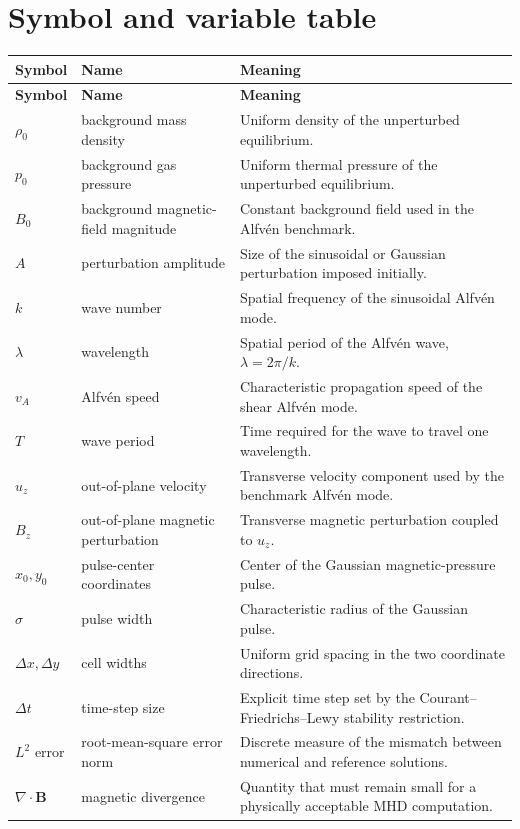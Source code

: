 \documentclass[11pt]{article}
\newcommand{\Bvec}{\mathbf{B}}
\begin{document}
\section{Symbol and variable table}
\begin{longtable}{>{\raggedright\arraybackslash}p{} >{\raggedright\arraybackslash}p{} >{\raggedright\arraybackslash}p{}}
\toprule
\textbf{Symbol} & \textbf{Name} & \textbf{Meaning} \\
\midrule
\endfirsthead
\toprule
\textbf{Symbol} & \textbf{Name} & \textbf{Meaning} \\
\midrule
\endhead
$\rho_0$ & background mass density & Uniform density of the unperturbed equilibrium. \\
$p_0$ & background gas pressure & Uniform thermal pressure of the unperturbed equilibrium. \\
$B_0$ & background magnetic-field magnitude & Constant background field used in the Alfv\'en benchmark. \\
$A$ & perturbation amplitude & Size of the sinusoidal or Gaussian perturbation imposed initially. \\
$k$ & wave number & Spatial frequency of the sinusoidal Alfv\'en mode. \\
$\lambda$ & wavelength & Spatial period of the Alfv\'en wave, $\lambda=2\pi/k$. \\
$v_A$ & Alfv\'en speed & Characteristic propagation speed of the shear Alfv\'en mode. \\
$T$ & wave period & Time required for the wave to travel one wavelength. \\
$u_z$ & out-of-plane velocity & Transverse velocity component used by the benchmark Alfv\'en mode. \\
$B_z$ & out-of-plane magnetic perturbation & Transverse magnetic perturbation coupled to $u_z$. \\
$x_0,y_0$ & pulse-center coordinates & Center of the Gaussian magnetic-pressure pulse. \\
$\sigma$ & pulse width & Characteristic radius of the Gaussian pulse. \\
$\Delta x,\Delta y$ & cell widths & Uniform grid spacing in the two coordinate directions. \\
$\Delta t$ & time-step size & Explicit time step set by the Courant--Friedrichs--Lewy stability restriction. \\
$L^2$ error & root-mean-square error norm & Discrete measure of the mismatch between numerical and reference solutions. \\
$\nabla\cdot\Bvec$ & magnetic divergence & Quantity that must remain small for a physically acceptable MHD computation. \\
\bottomrule
\end{longtable}
\end{document}
